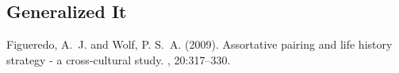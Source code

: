 \documentclass[DIV=calc, paper=a4, fontsize=11pt, twocolumn]{scrartcl}	 %
\begin{document}
\subsection{Generalized It}



\begin{thebibliography}{99} %

Figueredo, A.~J. and Wolf, P. S.~A. (2009).
\newblock Assortative pairing and life history strategy - a cross-cultural
  study.
, 20:317--330.
 
\end{thebibliography}

\end{document}
